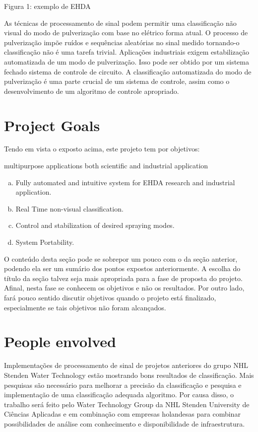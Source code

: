 Figura 1: exemplo de EHDA

As técnicas de processamento de sinal podem permitir uma classificação não visual do modo de pulverização com base no elétrico
forma atual. O processo de pulverização impõe ruídos e sequências aleatórias no sinal medido tornando-o
classificação não é uma tarefa trivial.
Aplicações industriais exigem estabilização automatizada de um modo de pulverização. Isso pode ser obtido por um sistema fechado
sistema de controle de circuito. A classificação automatizada do modo de pulverização é uma parte crucial de um sistema de controle, assim como
o desenvolvimento de um algoritmo de controle apropriado.

\section{Project Goals}
\label{sec:objetivos}

Tendo em vista o exposto acima, este projeto tem por objetivos:

multipurpose applications
both scientific and industrial application

\begin{enumerate}[a)]
\item Fully automated and intuitive system for EHDA research and industrial application.
\item Real Time non-visual classification.    
\item Control and stabilization of desired spraying modes.   
\item System Portability.
\end{enumerate}

O conteúdo desta seção pode se sobrepor um pouco com o da seção anterior, podendo ela ser um sumário dos pontos expostos anteriormente. A escolha do título da seção talvez seja mais apropriada para a fase de proposta do projeto. Afinal, nesta fase se conhecem os objetivos e não os resultados. Por outro lado, fará pouco sentido discutir objetivos quando o projeto está finalizado, especialmente se tais objetivos não foram alcançados. 

\section{People envolved}
\label{sec:empresa}

Implementações de processamento de sinal de projetos anteriores
do grupo NHL Stenden Water Technology estão mostrando bons resultados de classificação. Mais pesquisas são
necessário para melhorar a precisão da classificação e pesquisa e implementação de uma classificação adequada
algoritmo. Por causa disso, o trabalho será feito pelo Water Technology Group da NHL Stenden University
de Ciências Aplicadas e em combinação com empresas holandesas para combinar possibilidades de análise com conhecimento
e disponibilidade de infraestrutura.
